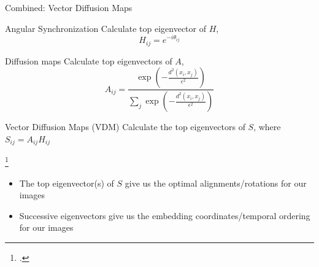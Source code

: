 \documentclass[10pt,aspectratio=169]{beamer}
\begin{document}
%
%
%
%
%
%
%
%
%

\begin{frame}{Combined: Vector Diffusion Maps}



	\begin{minipage}{0.45\textwidth}	
	\begin{block}{Angular Synchronization}
		Calculate top eigenvector of $H$,  
		$$H_{ij} = e^{-i \theta_{ij}}$$
	\end{block}
	\end{minipage}
	\hfill
	\begin{minipage}{0.45\textwidth}
	\begin{block}{Diffusion maps}
		Calculate top eigenvectors of $A$, 
		$$A_{ij} = \frac{\exp \left(-\frac{d^2(x_i, x_j)}{\epsilon^2}\right)}{\sum_j \exp \left(-\frac{d^2(x_i, x_j)}{\epsilon^2}\right)} $$
	\end{block}
	\end{minipage}	
	
	\begin{block}{Vector Diffusion Maps (VDM) \footnotemark} 
		Calculate the top eigenvectors of $S$, where $S_{ij} = A_{ij}H_{ij}$
		
	\end{block}
	\footcitetext{singer2012vector}

\begin{itemize}
\item The top eigenvector(s) of $S$ give us the optimal alignments/rotations for our images
\item Successive eigenvectors give us the embedding coordinates/temporal ordering for our images
\end{itemize}

\end{frame}
\end{document}
